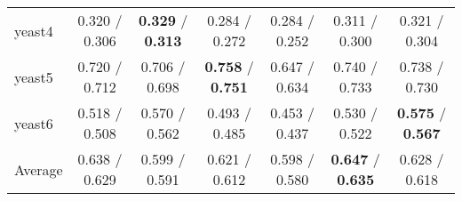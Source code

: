 \begin{table*}[ht]
\begin{tabular}{l|@{\hskip3pt}c@{\hskip3pt}|@{\hskip3pt}c@{\hskip3pt}|@{\hskip3pt}c@{\hskip3pt}|@{\hskip3pt}c@{\hskip3pt}|@{\hskip3pt}c@{\hskip3pt}|@{\hskip3pt}c@{\hskip3pt}}
\tabularnewline
yeast4 &  0.320  /  0.306  &  \textbf{0.329}  /  \textbf{0.313}  &  0.284  /  0.272  &  0.284  /  0.252  &  0.311  /  0.300  &  0.321  /  0.304 
\tabularnewline
yeast5 &  0.720  /  0.712  &  0.706  /  0.698  &  \textbf{0.758}  /  \textbf{0.751}  &  0.647  /  0.634  &  0.740  /  0.733  &  0.738  /  0.730 
\tabularnewline
yeast6 &  0.518  /  0.508  &  0.570  /  0.562  &  0.493  /  0.485  &  0.453  /  0.437  &  0.530  /  0.522  &  \textbf{0.575}  /  \textbf{0.567} 
\tabularnewline
\hline Average &  0.638  /  0.629  &  0.599  /  0.591  &  0.621  /  0.612  &  0.598  /  0.580  &  \textbf{0.647}  /  \textbf{0.635}  &  0.628  /  0.618 
\tabularnewline
\hline\end{tabular}\end{table*}



